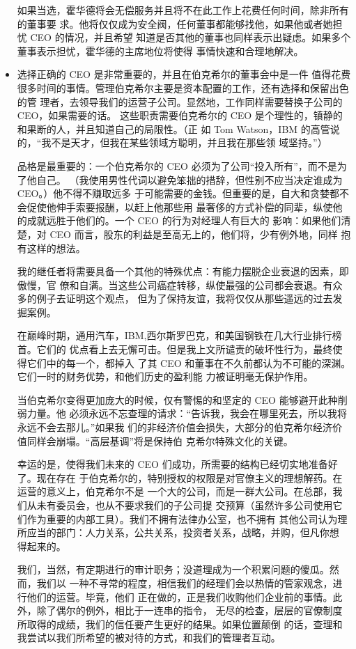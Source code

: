 \documentclass[UTF8,a4paper,zihao=-4,fontset = windows]{ctexart} %
\begin{document}
\begin{itemize}
如果当选，霍华德将会无偿服务并且将不在此工作上花费任何时间，除非所有的董事要
求。他将仅仅成为安全阀，任何董事都能够找他，如果他或者她担忧 CEO 的情况，并且希望
知道是否其他的董事也同样表示出疑虑。如果多个董事表示担忧，霍华德的主席地位将使得
事情快速和合理地解决。

    \item \noindent 选择正确的 CEO 是非常重要的，并且在伯克希尔的董事会中是一件
值得花费很多时间的事情。管理伯克希尔主要是资本配置的工作，还有选择和保留出色的管
理者，去领导我们的运营子公司。显然地，工作同样需要替换子公司的 CEO，如果需要的话。
这些职责需要伯克希尔的 CEO 是个理性的，镇静的和果断的人，并且知道自己的局限性。（正
如 Tom Watson，IBM 的高管说的，“我不是天才，但我在某些领域方聪明，并且我在那些领
域坚持。”）

品格是最重要的：一个伯克希尔的 CEO 必须为了公司“投入所有”，而不是为了他自己。
（我使用男性代词以避免笨拙的措辞，但性别不应当决定谁成为 CEO。）他不得不赚取远多
于可能需要的金钱。但重要的是，自大和贪婪都不会促使他伸手索要报酬，以赶上他那些用
最奢侈的方式补偿的同辈，纵使他的成就远胜于他们的。一个 CEO 的行为对经理人有巨大的
影响：如果他们清楚，对 CEO 而言，股东的利益是至高无上的，他们将，少有例外地，同样
抱有这样的想法。

我的继任者将需要具备一个其他的特殊优点：有能力摆脱企业衰退的因素，即傲慢，官
僚和自满。当这些公司癌症转移，纵使最强的公司都会衰退。有众多的例子去证明这个观点，
但为了保持友谊，我将仅仅从那些遥远的过去发掘案例。

在巅峰时期，通用汽车，IBM,西尔斯罗巴克，和美国钢铁在几大行业排行榜首。它们的
优点看上去无懈可击。但是我上文所谴责的破坏性行为，最终使得它们中的每一个，都掉入
了其 CEO 和董事在不久前都认为不可能的深渊。它们一时的财务优势，和他们历史的盈利能
力被证明毫无保护作用。

当伯克希尔变得更加庞大的时候，仅有警惕的和坚定的 CEO 能够避开此种削弱力量。他
必须永远不忘查理的请求：“告诉我，我会在哪里死去，所以我将永远不会去那儿。”如果我
们的非经济价值会损失，大部分的伯克希尔经济价值同样会崩塌。“高层基调”将是保持伯
克希尔特殊文化的关键。

幸运的是，使得我们未来的 CEO 们成功，所需要的结构已经切实地准备好了。现在存在
于伯克希尔的，特别授权的权限是对官僚主义的理想解药。在运营的意义上，伯克希尔不是
一个大的公司，而是一群大公司。在总部，我们从未有委员会，也从不要求我们的子公司提
交预算（虽然许多公司使用它们作为重要的内部工具）。我们不拥有法律办公室，也不拥有
其他公司认为理所应当的部门：人力关系，公共关系，投资者关系，战略，并购，但凡你想
得起来的。

我们，当然，有定期进行的审计职务；没道理成为一个积累问题的傻瓜。然而，我们以
一种不寻常的程度，相信我们的经理们会以热情的管家观念，进行他们的运营。毕竟，他们
正在做的，正是我们收购他们企业前的事情。此外，除了偶尔的例外，相比于一连串的指令，
无尽的检查，层层的官僚制度所取得的成绩，我们的信任要产生更好的结果。如果位置颠倒
的话，查理和我尝试以我们所希望的被对待的方式，和我们的管理者互动。


\end{itemize}
\end{document}
